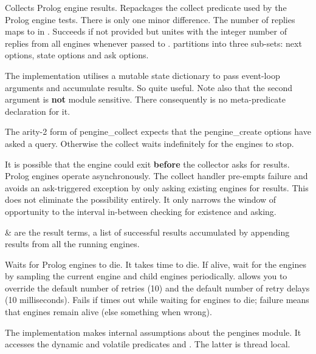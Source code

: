 \begin{description}
\nodescription
Collects Prolog engine results. Repackages the collect predicate
used by the Prolog engine tests. There is only one minor difference.
The number of replies maps to  in . Succeeds if not
provided but unites with the integer number of replies from all
engines whenever passed to .  partitions into three
sub-sets: next options, state options and ask options.

The implementation utilises a mutable state dictionary to pass
event-loop arguments and accumulate results. So quite useful. Note
also that the second  argument is \textbf{not} module sensitive. There
consequently is no meta-predicate declaration for it.

The arity-2 form of pengine_collect expects that the pengine_create
options have asked a query. Otherwise the collect waits indefinitely
for the engines to stop.

It is possible that the engine could exit \textbf{before} the collector
asks for results. Prolog engines operate asynchronously. The collect
handler pre-empts failure and avoids an ask-triggered exception by
only asking existing engines for results. This does not eliminate
the possibility entirely. It only narrows the window of opportunity
to the interval in-between checking for existence and asking.

\begin{arguments}
 & are the result terms, a list of successful  results
accumulated by appending results from all the running engines. \\
\end{arguments}

Waits for Prolog engines to die. It takes time to die. If alive,
wait for the engines by sampling the current engine and child
engines periodically.  allows you to override the default
number of retries (10) and the default number of retry delays (10
milliseconds). Fails if times out while waiting for engines to die;
failure means that engines remain alive (else something when wrong).

The implementation makes internal assumptions about the pengines
module. It accesses the dynamic and volatile predicates
 and . The latter is thread local.
\end{description}

